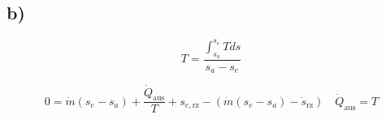 

\subsection*{b)}
\[
T = \frac{\int_{s_a}^{s_e} T ds}{s_a - s_e}
\]

\[
0 = \dot{m} (s_e - s_a) + \frac{\dot{Q}_{\text{aus}}}{T} + s_{e, \text{rz}} - \left( \dot{m} (s_e - s_a) - \dot{s}_{\text{rz}} \right) \quad \dot{Q}_{\text{aus}} = T
\]